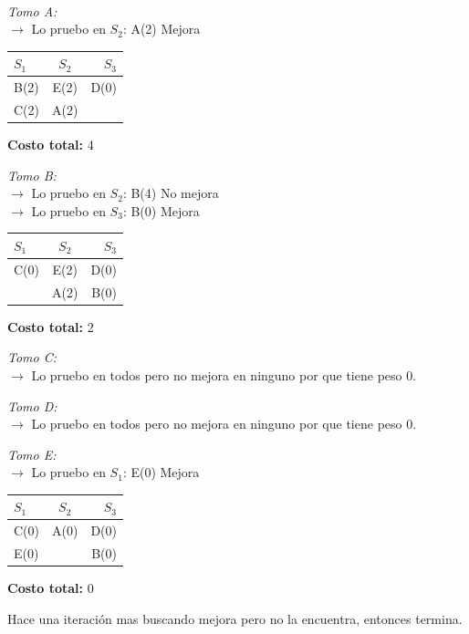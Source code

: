 \begin{minipage}[t]{0.5\linewidth}
     \\
    \raggedright{
        \textit{Tomo A:}\\
        $\rightarrow$ Lo pruebo en $S_{2}$: A(2) \checkmark Mejora
    }\\
    \begin{center}
      \begin{tabular}{ l | c | r }
        $S_{1}$ & $S_{2}$ & $S_{3}$ \\ \hline
        B(2) & E(2) & D(0) \\
        C(2) & A(2) &  \\
      \end{tabular}
      \textbf{Costo total:} 4
    \end{center}

    \raggedright{
        \textit{Tomo B:}\\
        $\rightarrow$ Lo pruebo en $S_{2}$: B(4) No mejora\\
        $\rightarrow$ Lo pruebo en $S_{3}$: B(0) \checkmark Mejora
    }\\
    \begin{center}
      \begin{tabular}{ l | c | r }
        $S_{1}$ & $S_{2}$ & $S_{3}$ \\ \hline
        C(0) & E(2) & D(0) \\
         & A(2) & B(0) \\
      \end{tabular}
      \textbf{Costo total:} 2
    \end{center}

    \raggedright{
        \textit{Tomo C:}\\
        $\rightarrow$ Lo pruebo en todos pero no mejora en ninguno por que tiene peso 0.
    }\\

    \raggedright{
        \textit{Tomo D:}\\
        $\rightarrow$ Lo pruebo en todos pero no mejora en ninguno por que tiene peso 0.
    }\\

    \raggedright{
        \textit{Tomo E:}\\
        $\rightarrow$ Lo pruebo en $S_{1}$: E(0) \checkmark Mejora
    }\\
    \begin{center}
      \begin{tabular}{ l | c | r }
        $S_{1}$ & $S_{2}$ & $S_{3}$ \\ \hline
        C(0) & A(0) & D(0) \\
        E(0) &  & B(0) \\
      \end{tabular}
      \textbf{Costo total:} 0
    \end{center}

    Hace una iteración mas buscando mejora pero no la encuentra, entonces termina. 

\end{minipage}
